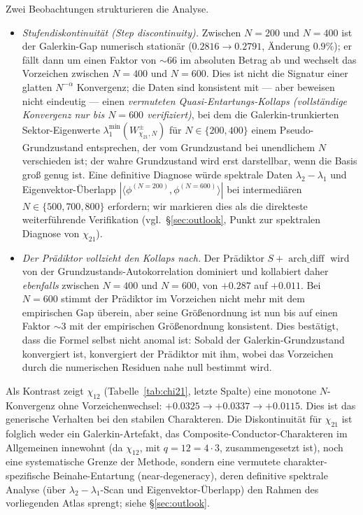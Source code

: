 \documentclass[a4paper,10pt,twocolumn]{article}
\theoremstyle{definition}
\theoremstyle{remark}
\newcommand{\chifn}{\chi}
\newcommand{\archdiff}{\operatorname{arch\_diff}}
\begin{document}
Zwei Beobachtungen strukturieren die Analyse.

\begin{itemize}
  \item[(i)] \emph{Stufendiskontinuität (Step discontinuity).} Zwischen $N=200$ und $N=400$
    ist der Galerkin-Gap numerisch stationär
    ($0.2816\to 0.2791$, Änderung $0.9\%$); er fällt dann um einen Faktor
    von $\sim 66$ im absoluten Betrag ab und wechselt das Vorzeichen zwischen $N=400$
    und $N=600$. Dies ist nicht die Signatur einer glatten
    $N^{-\alpha}$ Konvergenz; die Daten sind konsistent mit --- aber
    beweisen nicht eindeutig --- einen
    \emph{vermuteten Quasi-Entartungs-Kollaps (vollständige Konvergenz nur bis $N=600$ verifiziert)},
    bei dem die Galerkin-trunkierten Sektor-Eigenwerte
    $\lambda_1^{\min}(W^\pm_{\chifn_{21},N})$ für $N\in\{200,400\}$
    einem Pseudo-Grundzustand entsprechen, der vom Grundzustand bei
    unendlichem $N$ verschieden ist; der wahre Grundzustand wird erst
    darstellbar, wenn die Basis groß genug ist. Eine definitive
    Diagnose würde spektrale Daten $\lambda_2-\lambda_1$ und
    Eigenvektor-Überlapp $|\langle\phi^{(N=200)},\phi^{(N=600)}\rangle|$
    bei intermediären $N\in\{500,700,800\}$ erfordern; wir markieren
    dies als die direkteste weiterführende Verifikation
    (vgl.\ \S\ref{sec:outlook}, Punkt zur spektralen Diagnose von
    $\chifn_{21}$).
  \item[(ii)] \emph{Der Prädiktor vollzieht den Kollaps nach.} Der Prädiktor
    $S+\archdiff$ wird von der Grundzustands-Autokorrelation dominiert
    und kollabiert daher \emph{ebenfalls} zwischen $N=400$ und $N=600$,
    von $+0.287$ auf $+0.011$. Bei $N=600$ stimmt der Prädiktor im Vorzeichen nicht mehr
    mit dem empirischen Gap überein, aber seine Größenordnung ist nun
    bis auf einen Faktor $\sim 3$ mit der empirischen Größenordnung konsistent.
    Dies bestätigt, dass die Formel selbst nicht
    anomal ist: Sobald der Galerkin-Grundzustand konvergiert ist,
    konvergiert der Prädiktor mit ihm, wobei das Vorzeichen durch die
    numerischen Residuen nahe null bestimmt wird.
\end{itemize}

Als Kontrast zeigt $\chifn_{12}$ (Tabelle~\ref{tab:chi21}, letzte Spalte)
eine monotone $N$-Konvergenz ohne Vorzeichenwechsel:
$+0.0325\to+0.0337\to+0.0115$. Dies ist das generische Verhalten bei den
stabilen Charakteren. Die Diskontinuität für $\chifn_{21}$ ist folglich
weder ein Galerkin-Artefakt, das Composite-Conductor-Charakteren im Allgemeinen innewohnt
(da $\chifn_{12}$, mit $q=12=4\cdot 3$,
zusammengesetzt ist), noch eine systematische Grenze der Methode, sondern eine
vermutete charakter-spezifische Beinahe-Entartung (near-degeneracy),
deren definitive spektrale Analyse (über $\lambda_2-\lambda_1$-Scan
und Eigenvektor-Überlapp) den Rahmen des vorliegenden Atlas sprengt;
siehe \S\ref{sec:outlook}.
\end{document}
